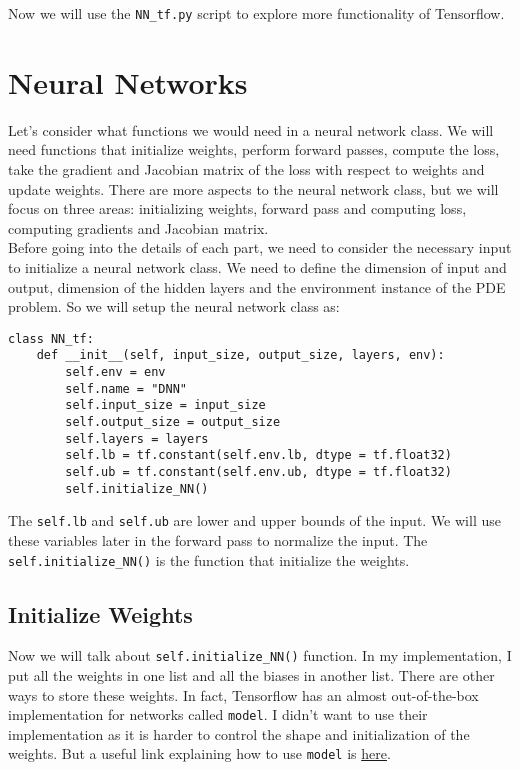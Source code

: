 \documentclass{article}
\begin{document}
Now we will use the \texttt{NN\_tf.py} script to explore more functionality of Tensorflow. 

\section{Neural Networks}
Let's consider what functions we would need in a neural network class. We will need functions that initialize weights, perform forward passes, compute the loss, take the gradient and Jacobian matrix of the loss with respect to weights and update weights. There are more aspects to the neural network class, but we will focus on three areas: initializing weights, forward pass and computing loss, computing gradients and Jacobian matrix. \\

Before going into the details of each part, we need to consider the necessary input to initialize a neural network class. We need to define the dimension of input and output, dimension of the hidden layers and the environment instance of the PDE problem. So we will setup the neural network class as:
\begin{lstlisting}
class NN_tf:
	def __init__(self, input_size, output_size, layers, env):
		self.env = env
		self.name = "DNN"
		self.input_size = input_size
		self.output_size = output_size
		self.layers = layers
		self.lb = tf.constant(self.env.lb, dtype = tf.float32)
		self.ub = tf.constant(self.env.ub, dtype = tf.float32)
		self.initialize_NN()
\end{lstlisting}

The \texttt{self.lb} and \texttt{self.ub} are lower and upper bounds of the input. We will use these variables later in the forward pass to normalize the input. The \texttt{self.initialize\_NN()} is the function that initialize the weights. 

\subsection{Initialize Weights}
Now we will talk about \texttt{self.initialize\_NN()} function. In my implementation, I put all the weights in one list and all the biases in another list. There are other ways to store these weights. In fact, Tensorflow has an almost out-of-the-box implementation for networks called \texttt{model}. I didn't want to use their implementation as it is harder to control the shape and initialization of the weights. But a useful link explaining how to use \texttt{model} is \href{https://www.tensorflow.org/tutorials/customization/custom_layers}{here}. \\
\end{document}
